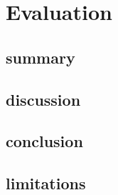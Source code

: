\chapter{Evaluation}\label{cha:conclusion}
\section{summary}
\section{discussion}
\section{conclusion}
\section{limitations}
